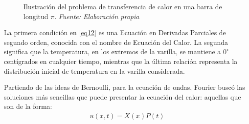 \begin{figure}[h]
	\centering
 	\caption[Ilustración del problema de transferencia de calor en una barra de longitud $\ell$.  ]{ Ilustración del problema de transferencia de calor en una barra de longitud $\pi$.  \textit{ Fuente: Elaboración propia} }
	\label{fig:barra-pi}  %
\end{figure}

La primera condición en \ref{eq12} es una Ecuación en Derivadas Parciales de segundo orden, conocida con el nombre de Ecuación del Calor. La segunda significa que la temperatura, en los extremos de la varilla, se mantiene a \( 0^\circ \) centígrados en cualquier tiempo, mientras que la última relación representa la distribución inicial de temperatura en la varilla considerada.

Partiendo de las ideas de Bernoulli, para la ecuación de ondas, Fourier buscó las soluciones más sencillas que puede presentar la ecuación del calor: aquellas que son de la forma:
\begin{equation} \label{eq14}
	\begin{split}
		u(x,t) = X(x)P(t) \\
	\end{split}
\end{equation}

